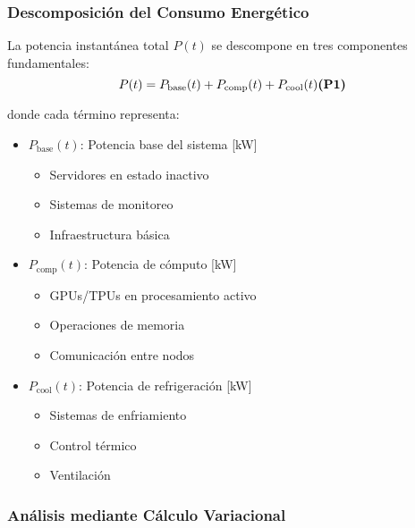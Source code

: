 \subsubsection{Descomposición del Consumo Energético}

\begin{definicion}
La potencia instantánea total $P(t)$ se descompone en tres componentes fundamentales:
\begin{equation}
    P(t) = P_{\text{base}}(t) + P_{\text{comp}}(t) + P_{\text{cool}}(t) \textbf{(P1)}
\end{equation}

\noindent donde cada término representa:
\begin{itemize}
    \item $P_{\text{base}}(t)$: Potencia base del sistema [kW]
    \begin{itemize}
        \item Servidores en estado inactivo
        \item Sistemas de monitoreo
        \item Infraestructura básica
    \end{itemize}
    
    \item $P_{\text{comp}}(t)$: Potencia de cómputo [kW]
    \begin{itemize}
        \item GPUs/TPUs en procesamiento activo
        \item Operaciones de memoria
        \item Comunicación entre nodos
    \end{itemize}
    
    \item $P_{\text{cool}}(t)$: Potencia de refrigeración [kW]
    \begin{itemize}
        \item Sistemas de enfriamiento
        \item Control térmico
        \item Ventilación
    \end{itemize}
\end{itemize}
\end{definicion}

\subsubsection{Análisis mediante Cálculo Variacional}

